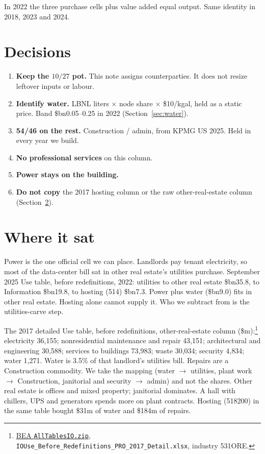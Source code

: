 \documentclass[11pt]{article}
\newcommand{\bn}{\$bn}
\begin{document}
In 2022 the three purchase cells plus value added equal output. Same identity in 2018, 2023 and 2024.

\section{Decisions}

\begin{enumerate}
\item \textbf{Keep the $10/27$ pot.} This note assigns counterparties. It does not resize leftover inputs or labour.
\item \textbf{Identify water.} LBNL liters $\times$ node share $\times$ \$10/kgal, held as a static price. Band \bn0.05--0.25 in 2022 (Section~\ref{sec:water}).
\item \textbf{54/46 on the rest.} Construction / admin, from KPMG US 2025. Held in every year we build.
\item \textbf{No professional services} on this column.
\item \textbf{Power stays on the building.}
\item \textbf{Do not copy} the 2017 hosting column or the raw other-real-estate column (Section~\ref{sec:where}).
\end{enumerate}

\section{Where it sat}
\label{sec:where}

Power is the one official cell we can place. Landlords pay tenant electricity, so most of the data-center bill sat in other real estate's utilities purchase. September 2025 Use table, before redefinitions, 2022: utilities to other real estate \bn35.8, to Information \bn19.8, to hosting (514) \bn7.3. Power plus water (\bn9.0) fits in other real estate. Hosting alone cannot supply it. Who we subtract from is the utilities-carve step.

The 2017 detailed Use table, before redefinitions, other-real-estate column (\$m):\footnote{\href{https://apps.bea.gov/industry/iTables\%20Static\%20Files/AllTablesIO.zip}{BEA \texttt{AllTablesIO.zip}}, \texttt{IOUse\_Before\_Redefinitions\_PRO\_2017\_Detail.xlsx}, industry 531ORE.} electricity 36{,}155; nonresidential maintenance and repair 43{,}151; architectural and engineering 30{,}588; services to buildings 73{,}983; waste 30{,}034; security 4{,}834; water 1{,}271. Water is 3.5\% of that landlord's utilities bill. Repairs are a Construction commodity. We take the mapping (water $\to$ utilities, plant work $\to$ Construction, janitorial and security $\to$ admin) and not the shares. Other real estate is offices and mixed property; janitorial dominates. A hall with chillers, UPS and generators spends more on plant contracts. Hosting (518200) in the same table bought \$31m of water and \$184m of repairs.
\end{document}
